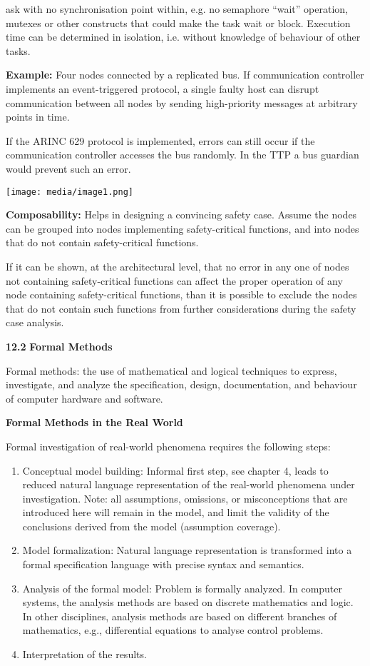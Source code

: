 ask with no synchronisation point within, e.g. no semaphore ``wait''
operation, mutexes or other constructs that could make the task wait or
block. Execution time can be determined in isolation, i.e. without
knowledge of behaviour of other tasks.

\textbf{Example:} Four nodes connected by a replicated bus. If
communication controller implements an event-triggered protocol, a
single faulty host can disrupt communication between all nodes by
sending high-priority messages at arbitrary points in time.

If the ARINC 629 protocol is implemented, errors can still occur if the
communication controller accesses the bus randomly. In the TTP a bus
guardian would prevent such an error.

\texttt{[image: media/image1.png]}

\textbf{Composability:} Helps in designing a convincing safety case.
Assume the nodes can be grouped into nodes implementing safety-critical
functions, and into nodes that do not contain safety-critical functions.

If it can be shown, at the architectural level, that no error in any one
of nodes not containing safety-critical functions can affect the proper
operation of any node containing safety-critical functions, than it is
possible to exclude the nodes that do not contain such functions from
further considerations during the safety case analysis.

\textbf{12.2} \protect\hypertarget{teil3}{}{}\textbf{Formal Methods }

Formal methods: the use of mathematical and logical techniques to
express, investigate, and analyze the specification, design,
documentation, and behaviour of computer hardware and software.

\textbf{Formal Methods in the Real World}

Formal investigation of real-world phenomena requires the following
steps:

\begin{enumerate}
\def\labelenumi{\arabic{enumi}.}
\item
  Conceptual model building: Informal first step, see chapter 4, leads
  to reduced natural language representation of the real-world phenomena
  under investigation. Note: all assumptions, omissions, or
  misconceptions that are introduced here will remain in the model, and
  limit the validity of the conclusions derived from the model
  (assumption coverage).
\item
  Model formalization: Natural language representation is transformed
  into a formal specification language with precise syntax and
  semantics.
\item
  Analysis of the formal model: Problem is formally analyzed. In
  computer systems, the analysis methods are based on discrete
  mathematics and logic. In other disciplines, analysis methods are
  based on different branches of mathematics, e.g., differential
  equations to analyse control problems.
\item
  Interpretation of the results.
\end{enumerate}

